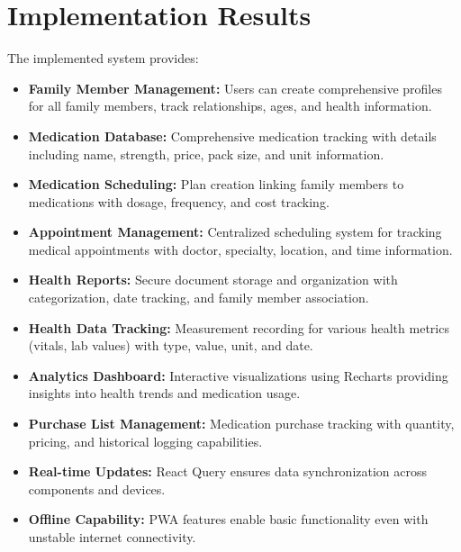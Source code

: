 \documentclass[12pt, a4paper]{report}
\begin{document}
\section{Implementation Results}
The implemented system provides:
\begin{itemize}
    \item \textbf{Family Member Management:} Users can create comprehensive profiles for all family members, track relationships, ages, and health information.
    \item \textbf{Medication Database:} Comprehensive medication tracking with details including name, strength, price, pack size, and unit information.
    \item \textbf{Medication Scheduling:} Plan creation linking family members to medications with dosage, frequency, and cost tracking.
    \item \textbf{Appointment Management:} Centralized scheduling system for tracking medical appointments with doctor, specialty, location, and time information.
    \item \textbf{Health Reports:} Secure document storage and organization with categorization, date tracking, and family member association.
    \item \textbf{Health Data Tracking:} Measurement recording for various health metrics (vitals, lab values) with type, value, unit, and date.
    \item \textbf{Analytics Dashboard:} Interactive visualizations using Recharts providing insights into health trends and medication usage.
    \item \textbf{Purchase List Management:} Medication purchase tracking with quantity, pricing, and historical logging capabilities.
    \item \textbf{Real-time Updates:} React Query ensures data synchronization across components and devices.
    \item \textbf{Offline Capability:} PWA features enable basic functionality even with unstable internet connectivity.
\end{itemize}

\newpage
\end{document}
